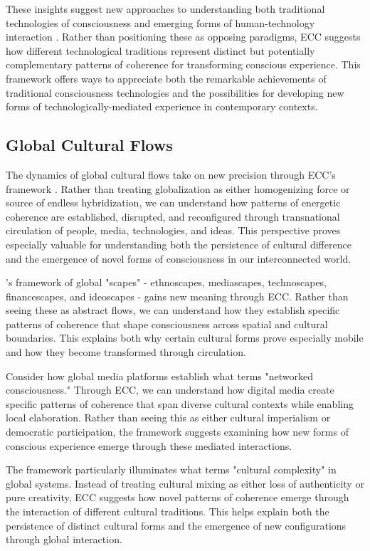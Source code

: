 These insights suggest new approaches to understanding both traditional technologies of consciousness and emerging forms of human-technology interaction \cite{verbeek2005what}. Rather than positioning these as opposing paradigms, ECC suggests how different technological traditions represent distinct but potentially complementary patterns of coherence for transforming conscious experience. This framework offers ways to appreciate both the remarkable achievements of traditional consciousness technologies and the possibilities for developing new forms of technologically-mediated experience in contemporary contexts.

\subsection{Global Cultural Flows}

The dynamics of global cultural flows take on new precision through ECC's framework \cite{appadurai1996modernity}. Rather than treating globalization as either homogenizing force or source of endless hybridization, we can understand how patterns of energetic coherence are established, disrupted, and reconfigured through transnational circulation of people, media, technologies, and ideas. This perspective proves especially valuable for understanding both the persistence of cultural difference and the emergence of novel forms of consciousness in our interconnected world.

\cite{appadurai1996modernity}'s framework of global "scapes" - ethnoscapes, mediascapes, technoscapes, financescapes, and ideoscapes - gains new meaning through ECC. Rather than seeing these as abstract flows, we can understand how they establish specific patterns of coherence that shape consciousness across spatial and cultural boundaries. This explains both why certain cultural forms prove especially mobile and how they become transformed through circulation.

Consider how global media platforms establish what \cite{castells2010rise} terms "networked consciousness." Through ECC, we can understand how digital media create specific patterns of coherence that span diverse cultural contexts while enabling local elaboration. Rather than seeing this as either cultural imperialism or democratic participation, the framework suggests examining how new forms of conscious experience emerge through these mediated interactions.

The framework particularly illuminates what \cite{hannerz1996transnational} terms "cultural complexity" in global systems. Instead of treating cultural mixing as either loss of authenticity or pure creativity, ECC suggests how novel patterns of coherence emerge through the interaction of different cultural traditions. This helps explain both the persistence of distinct cultural forms and the emergence of new configurations through global interaction.

